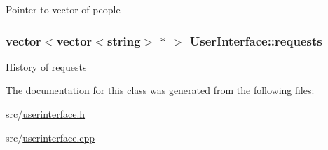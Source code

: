 \label{df/de1/classUserInterface_a3d0914e9d2ba661bc3691397c695287e}
Pointer to vector of people \hypertarget{classUserInterface_af1cb3bd8de564e4610d863937986d60e}{
\subsubsection[{requests}]{\setlength{\rightskip}{0pt plus 5cm}vector$<$vector$<$string$>$ $\ast$ $>$ {\bf UserInterface::requests}}}
\label{df/de1/classUserInterface_af1cb3bd8de564e4610d863937986d60e}
History of requests 

The documentation for this class was generated from the following files:\begin{DoxyCompactItemize}
\item 
src/\hyperlink{userinterface_8h}{userinterface.h}\item 
src/\hyperlink{userinterface_8cpp}{userinterface.cpp}\end{DoxyCompactItemize}
